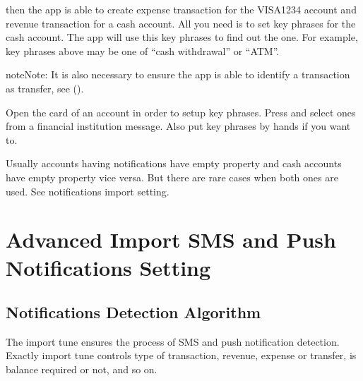 \documentclass[a4paper,10pt,english]{sphinxmanual}
\begin{document}
then the app is able to create expense transaction for the VISA1234 account and revenue transaction
for a cash account. All you need is to set key phrases for the cash account. The app will
use this key phrases to find out the one. For example, key phrases above may be one of “cash withdrawal” or
“ATM”.

\begin{sphinxadmonition}{note}{Note:}
It is also necessary to ensure the app is able to identify a transaction as transfer, see {\hyperref[\detokenize{notifications:chapter-notifications}]{}} ().
\end{sphinxadmonition}

Open the card of an account in order to setup key phrases. Press  and
select ones from a financial institution message. Also put key phrases by hands
if you want to.

\noindent{}
\noindent{}
\noindent{}

Usually accounts having notifications have empty  property and cash accounts
have empty  property vice versa. But there are rare cases when both ones are used. See 
notifications import setting.


\chapter{Advanced Import SMS and Push Notifications Setting}
\label{\detokenize{notifications:advanced-import-sms-and-push-notifications-setting}}\label{\detokenize{notifications:chapter-notifications}}\label{\detokenize{notifications::doc}}

\section{Notifications Detection Algorithm}
\label{\detokenize{notifications:notifications-detection-algorithm}}
The import tune ensures the process of SMS and push notification detection. Exactly import
tune controls type of transaction, revenue, expense or transfer, is balance required or not,
and so on.
\end{document}

